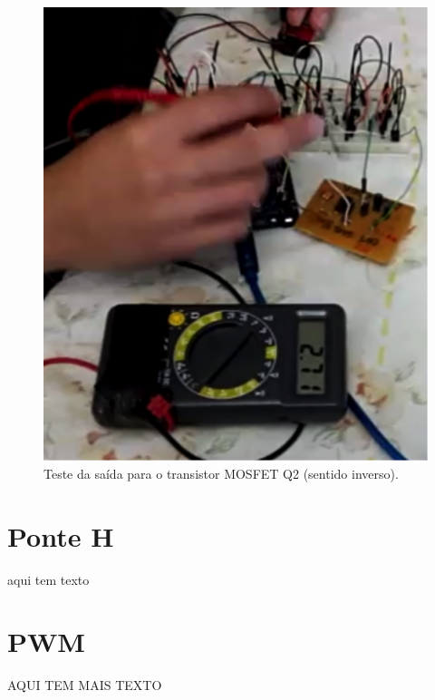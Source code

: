 \begin{anexosenv}
      \begin{figure}
          \begin{center}
              \includegraphics{figuras/teste_alimentacao_5.png}
          \end{center}
          \caption{Teste da saída para o transistor MOSFET Q2 (sentido inverso).}
          \label{fig:teste_alimentacao_5.png}
      \end{figure}

      \section{Ponte H}

      aqui tem texto

      \section{PWM}

      AQUI TEM MAIS TEXTO









\end{anexosenv}
